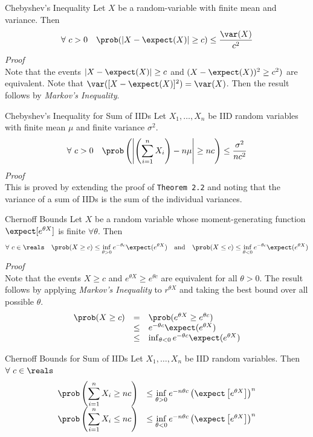 \documentclass[11pt,a4paper]{article}
\begin{document}
\begin{theorem}{Chebyshev's Inequality}
  Let $X$ be a random-variable with finite mean and variance. Then
  \[ \forall\ c>0\quad\prob(|X-\expect(X)|\geq c)\leq\frac{\var(X)}{c^2}\]
  \textit{Proof}\\
  Note that the events $|X-\expect(X)|\geq c$ and $(X-\expect(X))^2\ge c^2)$ are equivalent. Note that $\var([X-\expect(X)]^2)=\var(X)$. Then the result follows by \textit{Markov's Inequality}.
\end{theorem}

\begin{theorem}{Chebyshev's Inequality for Sum of IIDs}
  Let $X_1,\dots,X_n$ be IID random variables with finite mean $\mu$ and finite variance $\sigma^2$.
  \[ \forall\ c>0\quad\prob\left(\left|\left(\sum_{i=1}^nX_i\right)-n\mu\right|\geq nc\right)\leq\frac{\sigma^2}{nc^2} \]
  \textit{Proof}\\
  This is proved by extending the proof of \texttt{Theorem 2.2} and noting that the variance of a sum of IIDs is the sum of the individual variances.
\end{theorem}

\begin{theorem}{Chernoff Bounds}
  Let $X$ be a random variable whose moment-generating function $\expect[e^{\theta X}]$ is finite $\forall\theta$. Then
  \[ \forall\ c\in\reals\quad\prob(X\geq c)\leq\inf_{\theta>0}e^{-\theta c}\expect(e^{\theta X})\quad\text{and}\quad\prob(X\leq c)\leq\inf_{\theta<0}e^{-\theta c}\expect(e^{\theta X}) \]
  \textit{Proof}\\
  Note that the events $X\geq c$ and $e^{\theta X}\geq e^{\theta c}$ are equivalent for all $\theta>0$. The result follows by applying \textit{Markov's Inequality} to $r^{\theta X}$ and taking the best bound over all possible $\theta$.
  \[\begin{array}{rcl}
    \prob(X\geq c)&=&\prob(e^{\theta X}\geq e^{\theta c})\\
    &\leq&e^{-\theta c}\expect(e^{\theta X})\\
    &\leq&\inf_{\theta<0}e^{-\theta c}\expect(e^{\theta X}) %
  \end{array}\]
\end{theorem}

\begin{theorem}{Chernoff Bounds for Sum of IIDs}
  Let $X_1,\dots,X_n$ be IID random variables. Then $\forall\ c\in\reals$
  \[\begin{array}{rcl}
    {\displaystyle\prob\left(\sum_{i=1}^nX_i\geq nc\right)}&\leq\inf\limits_{\theta>0}e^{-n\theta c}\left(\expect\left[e^{\theta X}\right]\right)^n\\
    {\displaystyle\prob\left(\sum_{i=1}^nX_i\leq nc\right)}&\leq\inf\limits_{\theta<0}e^{-n\theta c}\left(\expect\left[e^{\theta X}\right]\right)^n
  \end{array}\]
\end{theorem}
\end{document}
